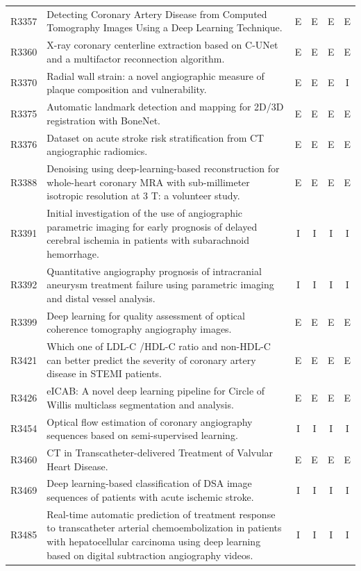 \begin{longtable}{@{}l p{8.6cm} c c c c@{}}
R3357 & Detecting Coronary Artery Disease from Computed Tomography Images Using a Deep Learning Technique. & E & E & E & E \\
R3360 & X-ray coronary centerline extraction based on C-UNet and a multifactor reconnection algorithm. & E & E & E & E \\
R3370 & Radial wall strain: a novel angiographic measure of plaque composition and vulnerability. & E & E & E & I \\
R3375 & Automatic landmark detection and mapping for 2D/3D registration with BoneNet. & E & E & E & E \\
R3376 & Dataset on acute stroke risk stratification from CT angiographic radiomics. & E & E & E & E \\
R3388 & Denoising using deep-learning-based reconstruction for whole-heart coronary MRA with sub-millimeter isotropic resolution at 3 T: a volunteer study. & E & E & E & E \\
R3391 & Initial investigation of the use of angiographic parametric imaging for early prognosis of delayed cerebral ischemia in patients with subarachnoid hemorrhage. & I & I & I & I \\
R3392 & Quantitative angiography prognosis of intracranial aneurysm treatment failure using parametric imaging and distal vessel analysis. & I & I & I & I \\
R3399 & Deep learning for quality assessment of optical coherence tomography angiography images. & E & E & E & E \\
R3421 & Which one of LDL-C /HDL-C ratio and non-HDL-C can better predict the severity of coronary artery disease in STEMI patients. & E & E & E & E \\
R3426 & eICAB: A novel deep learning pipeline for Circle of Willis multiclass segmentation and analysis. & E & E & E & E \\
R3454 & Optical flow estimation of coronary angiography sequences based on semi-supervised learning. & I & I & I & I \\
R3460 & CT in Transcatheter-delivered Treatment of Valvular Heart Disease. & E & E & E & E \\
R3469 & Deep learning-based classification of DSA image sequences of patients with acute ischemic stroke. & I & I & I & I \\
R3485 & Real-time automatic prediction of treatment response to transcatheter arterial chemoembolization in patients with hepatocellular carcinoma using deep learning based on digital subtraction angiography videos. & I & I & I & I \\

\end{longtable}
